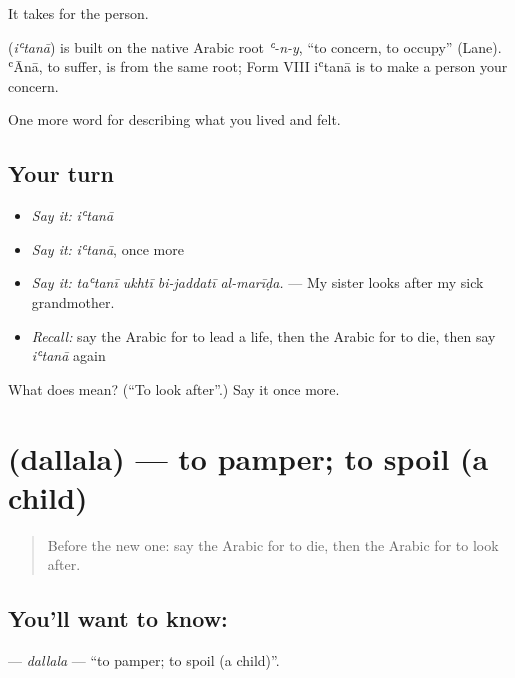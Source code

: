It takes  for the person.

\begin{cousinweb}
\textbf{} (\emph{iʿtanā}) is built on the native Arabic root \emph{ʿ-n-y}, \textquotedblleft{}to concern, to occupy\textquotedblright{} (Lane). ʿĀnā, to suffer, is from the same root; Form VIII iʿtanā is to make a person your concern.
\end{cousinweb}

\begin{grammarlens}[title={What you've built}]
One more word for describing what you lived and felt.
\end{grammarlens}

\subsection*{Your turn}
\begin{itemize}
\raggedright
  \item \emph{Say it:} \emph{iʿtanā}
  \item \emph{Say it:} \emph{iʿtanā}, once more
  \item \emph{Say it:} \emph{taʿtanī ukhtī bi-jaddatī al-marīḍa.} — My sister looks after my sick grandmother.
  \item \emph{Recall:} say the Arabic for to lead a life, then the Arabic for to die, then say \emph{iʿtanā} again
\end{itemize}

\begin{tcolorbox}[breakable,colback=teal!4,colframe=teal!35!black,title={Before you move on}]
What does  mean? (\textquotedblleft{}To look after\textquotedblright{}.) Say it once more.
\end{tcolorbox}
\section[\texorpdfstring{\ar{دلل} (dallala)}{دلل (dallala)}]{ (dallala) — to pamper; to spoil (a child)}

\label{lesson:AR-C533-dallala}



\begin{quote}
Before the new one: say the Arabic for to die, then the Arabic for to look after.
\end{quote}

\subsection*{You'll want to know: }
\textbf{} — \emph{dallala} — \textquotedblleft{}to pamper; to spoil (a child)\textquotedblright{}.

